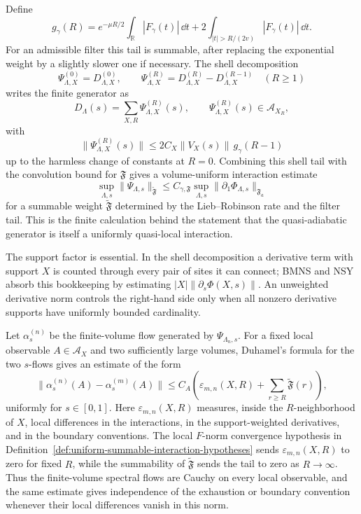 Define
\[
  g_\gamma(R)
  =
  e^{-\mu R/2}\int_{\mathbb R}|F_\gamma(t)|\,\dd t
  +
  2\int_{|t|>R/(2v)}|F_\gamma(t)|\,\dd t .
\]
For an admissible filter this tail is summable, after replacing the exponential
weight by a slightly slower one if necessary.  The shell decomposition
\[
  \Psi_{\Lambda,X}^{(0)}=D_{\Lambda,X}^{(0)},\qquad
  \Psi_{\Lambda,X}^{(R)}
  =
  D_{\Lambda,X}^{(R)}-D_{\Lambda,X}^{(R-1)}
  \quad (R\ge1)
\]
writes the finite generator as
\[
  D_\Lambda(s)=\sum_{X,R}\Psi_{\Lambda,X}^{(R)}(s),
  \qquad
  \Psi_{\Lambda,X}^{(R)}(s)\in\mathcal A_{X_R},
\]
with
\[
  \|\Psi_{\Lambda,X}^{(R)}(s)\|
  \le
  2C_X\|V_X(s)\|\,g_\gamma(R-1)
\]
up to the harmless change of constants at \(R=0\).  Combining this shell tail
with the convolution bound for \(\mathfrak F\) gives a volume-uniform
interaction estimate
\[
  \sup_{\Lambda,s}\|\Psi_{\Lambda,s}\|_{\widetilde{\mathfrak F}}
  \le
  C_{\gamma,\mathfrak F}
  \sup_{\Lambda,s}\|\partial_1\Phi_{\Lambda,s}\|_{\mathfrak F_a}
\]
for a summable weight \(\widetilde{\mathfrak F}\) determined by the
Lieb--Robinson rate and the filter tail.  This is the finite calculation behind
the statement that the quasi-adiabatic generator is itself a uniformly
quasi-local interaction.

The support factor is essential.  In the shell decomposition a derivative term
with support \(X\) is counted through every pair of sites it can connect; BMNS
and NSY absorb this bookkeeping by estimating
\(|X|\|\partial_s\Phi(X,s)\|\).  An unweighted derivative norm controls the
right-hand side only when all nonzero derivative supports have uniformly
bounded cardinality.

Let \(\alpha_s^{(n)}\) be the finite-volume flow generated by
\(\Psi_{\Lambda_n,s}\).  For a fixed local observable \(A\in\mathcal A_X\) and
two sufficiently large volumes, Duhamel's formula for the two \(s\)-flows gives
an estimate of the form
\[
  \|\alpha_s^{(n)}(A)-\alpha_s^{(m)}(A)\|
  \le
  C_A
  \left(
    \varepsilon_{m,n}(X,R)
    +
    \sum_{r\ge R}\widetilde{\mathfrak F}(r)
  \right),
\]
uniformly for \(s\in[0,1]\).  Here \(\varepsilon_{m,n}(X,R)\) measures, inside
the \(R\)-neighborhood of \(X\), local differences in the interactions, in the
support-weighted derivatives, and in the boundary conventions.  The local
\(F\)-norm convergence hypothesis in
Definition~\ref{def:uniform-summable-interaction-hypotheses} sends
\(\varepsilon_{m,n}(X,R)\) to zero for fixed \(R\), while the summability of
\(\widetilde{\mathfrak F}\) sends the tail to zero as \(R\to\infty\).  Thus the
finite-volume spectral flows are Cauchy on every local observable, and the
same estimate gives independence of the exhaustion or boundary convention
whenever their local differences vanish in this norm.

